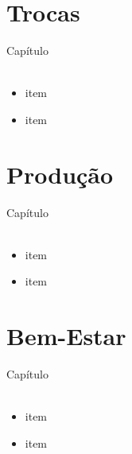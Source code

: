 \documentclass{beamer}[10]
\begin{document}
\begin{frame}
	\frametitle{}

	

\end{frame}

\section[Trocas]{Trocas}
\begin{frame}
	\huge Capítulo \normalsize
	\\~\\
	\begin{itemize}
		\item item
		\item item
	\end{itemize}
\end{frame}


\begin{frame}
	\frametitle{}

	

\end{frame}

\section[Produção]{Produção}
\begin{frame}
	\huge Capítulo \normalsize
	\\~\\
	\begin{itemize}
		\item item
		\item item
	\end{itemize}
\end{frame}


\begin{frame}
	\frametitle{}

	

\end{frame}

\section[Bem-Estar]{Bem-Estar}
\begin{frame}
	\huge Capítulo \normalsize
	\\~\\
	\begin{itemize}
		\item item
		\item item
	\end{itemize}
\end{frame}
\end{document}
